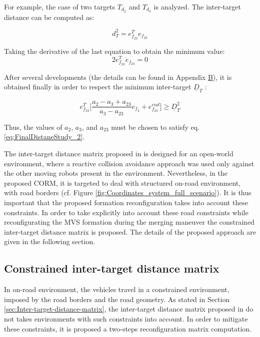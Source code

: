 For example, the case of two targets $T_{d_2}$ and $T_{d_3}$ is analyzed. The inter-target distance can be computed as: 

\begin{equation}\label{eq:derivative_inter_target}
    d_T^2 = e_{f_{23}}^Te_{f_{23}}
\end{equation}


Taking the derivative of the last equation to obtain the minimum value: 
\begin{equation} \label{eq:nul_distane_derivative}
    2e_{f_{23}}^T\dot{e}_{f_{23}}=0
\end{equation}

After several developments (the details can be found in Appendix \hyperlink{AppendixB}{B}), it is obtained finally in order to respect the minimum inter-target $\underline{D}_T$ \cite{8430659}: 

\begin{equation}\label{eq:FinalDistaneStudy_2}
    e_{f_{23}}^T \Big[\frac{a_2-a_3+a_{23}}{a_3-a_{23}}{e}_{f_2} + {e}_{f_{23}}^{end} \Big] \geq \underline{D}_{T} ^2 
\end{equation}

Thus, the values of $a_2$, $a_3$, and $a_{23}$ must be chosen to satisfy eq. \ref{eq:FinalDistaneStudy_2}.




The inter-target distance matrix proposed in \cite{8430659} is designed for an open-world environment, where a reactive collision avoidance approach was used only against the other moving robots present in the environment. Nevertheless, in the proposed CORM, it is targeted to deal with structured on-road environment, with road borders (cf. Figure \ref{fig:Coordinates_system_full_scenario}). It is thus important that the proposed formation reconfiguration takes into account these constraints. In order to take explicitly into account these road constraints while reconfigurating the MVS formation during the merging maneuver the constrained inter-target distance matrix is proposed. The details of the proposed approach are given in the following section.  


\subsection{Constrained inter-target distance matrix}
In on-road environment, the vehicles travel in a constrained environment, imposed by the road borders and the road geometry. As stated in Section \ref{sec:Inter-target-distance-matrix}, the inter-target distance matrix proposed in \cite{8430659} do not takes environments with such constraints into account. In order to mitigate these constraints, it is proposed a two-steps reconfiguration matrix computation. 

